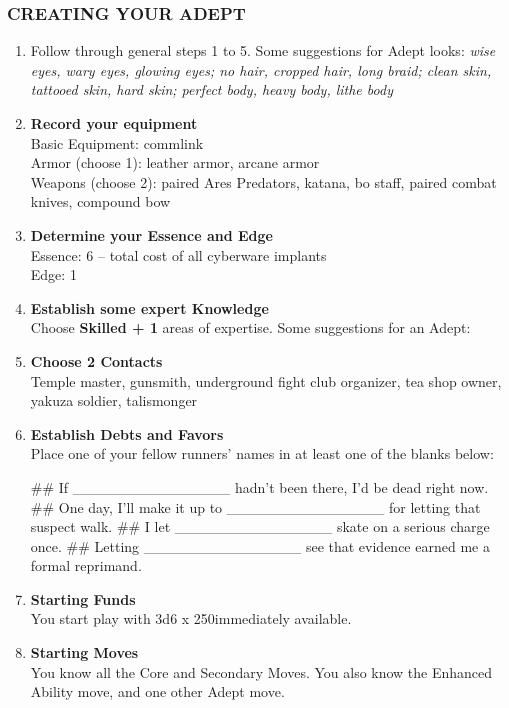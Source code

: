 \subsubsection{CREATING YOUR ADEPT}
\begin{enumerate}
    \item Follow through general steps 1 to 5. Some suggestions for Adept looks: \textit{wise eyes, wary eyes, glowing eyes; no hair, cropped hair, long braid; clean skin, tattooed skin, hard skin; perfect body, heavy body, lithe body}
    
    \item \textbf{Record your equipment} \\
    Basic Equipment: commlink \\
    Armor (choose 1): leather armor, arcane armor \\
    Weapons (choose 2): paired Ares Predators, katana, bo staff, paired combat knives, compound bow
    
    \item \textbf{Determine your Essence and Edge} \\
    Essence: 6 – total cost of all cyberware implants \\
    Edge: 1

    \item \textbf{Establish some expert Knowledge} \\
    Choose \textbf{\textsf{Skilled + 1}} areas of expertise. Some suggestions for an Adept: \textit{}
    
    \item \textbf{Choose 2 Contacts} \\
    Temple master, gunsmith, underground fight club organizer, tea shop owner, yakuza soldier, talismonger
    
    \item \textbf{Establish Debts and Favors} \\
    Place one of your fellow runners’ names in at least one of the blanks below:
        \begin{easylist}
            ## If \_\_\_\_\_\_\_\_\_\_\_\_\_\_\_ hadn’t been there, I’d be dead right now.
            ## One day, I’ll make it up to \_\_\_\_\_\_\_\_\_\_\_\_\_\_\_ for letting that suspect walk.
            ## I let \_\_\_\_\_\_\_\_\_\_\_\_\_\_\_ skate on a serious charge once. 
            ## Letting \_\_\_\_\_\_\_\_\_\_\_\_\_\_\_ see that evidence earned me a formal reprimand.
        \end{easylist}
    
    \item \textbf{Starting Funds} \\
    You start play with 3d6 x 250\nuyen immediately available.
    
    \item \textbf{Starting Moves} \\
    You know all the Core and Secondary Moves. You also know the Enhanced Ability move, and one other Adept move.
\end{enumerate}


